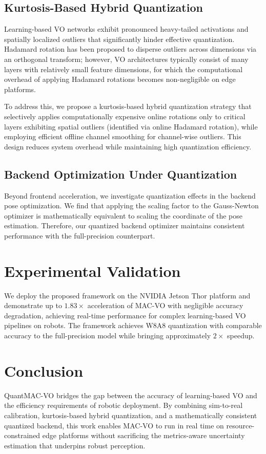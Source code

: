 \subsection{Kurtosis-Based Hybrid Quantization}

Learning-based VO networks exhibit pronounced heavy-tailed activations and spatially localized outliers that significantly hinder effective quantization. Hadamard rotation has been proposed to disperse outliers across dimensions via an orthogonal transform; however, VO architectures typically consist of many layers with relatively small feature dimensions, for which the computational overhead of applying Hadamard rotations becomes non-negligible on edge platforms.

To address this, we propose a kurtosis-based hybrid quantization strategy that selectively applies computationally expensive online rotations only to critical layers exhibiting spatial outliers (identified via online Hadamard rotation), while employing efficient offline channel smoothing for channel-wise outliers. This design reduces system overhead while maintaining high quantization efficiency.

\subsection{Backend Optimization Under Quantization}

Beyond frontend acceleration, we investigate quantization effects in the backend pose optimization. We find that applying the scaling factor to the Gauss-Newton optimizer is mathematically equivalent to scaling the coordinate of the pose estimation. Therefore, our quantized backend optimizer maintains consistent performance with the full-precision counterpart.

\section{Experimental Validation}

We deploy the proposed framework on the NVIDIA Jetson Thor platform and demonstrate up to $1.83\times$ acceleration of MAC-VO with negligible accuracy degradation, achieving real-time performance for complex learning-based VO pipelines on robots. The framework achieves W8A8 quantization with comparable accuracy to the full-precision model while bringing approximately $2\times$ speedup.

\section{Conclusion}

QuantMAC-VO bridges the gap between the accuracy of learning-based VO and the efficiency requirements of robotic deployment. By combining sim-to-real calibration, kurtosis-based hybrid quantization, and a mathematically consistent quantized backend, this work enables MAC-VO to run in real time on resource-constrained edge platforms without sacrificing the metrics-aware uncertainty estimation that underpins robust perception.
